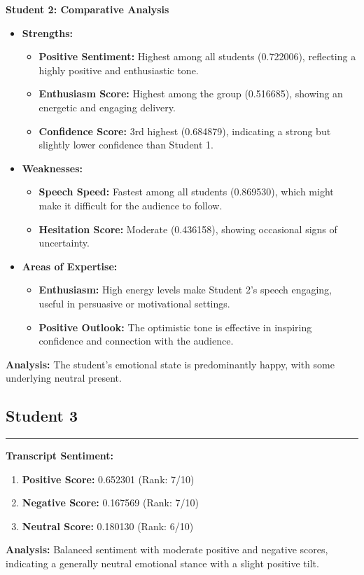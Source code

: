 \documentclass{article}
\begin{document}
\textbf{Student 2: Comparative Analysis}
\begin{itemize}
    \item \textbf{Strengths:}
    \begin{itemize}
        \item \textbf{Positive Sentiment:} Highest among all students (0.722006), reflecting a highly positive and enthusiastic tone.
        \item \textbf{Enthusiasm Score:} Highest among the group (0.516685), showing an energetic and engaging delivery.
        \item \textbf{Confidence Score:} 3rd highest (0.684879), indicating a strong but slightly lower confidence than Student 1.
    \end{itemize}
    \item \textbf{Weaknesses:}
    \begin{itemize}
        \item \textbf{Speech Speed:} Fastest among all students (0.869530), which might make it difficult for the audience to follow.
        \item \textbf{Hesitation Score:} Moderate (0.436158), showing occasional signs of uncertainty.
    \end{itemize}
    \item \textbf{Areas of Expertise:}
    \begin{itemize}
        \item \textbf{Enthusiasm:} High energy levels make Student 2's speech engaging, useful in persuasive or motivational settings.
        \item \textbf{Positive Outlook:} The optimistic tone is effective in inspiring confidence and connection with the audience.
    \end{itemize}
\end{itemize}
    \textbf{Analysis:} The student's emotional state is predominantly happy, with some underlying neutral present.

\subsection{Student 3}
\begin{center}
    \color{green}\rule{1\linewidth}{0.7mm}
\end{center}
\large{\textbf{Transcript Sentiment:}}
\begin{tcolorbox}[title=Sentiment Breakdown]
    \begin{enumerate}
        \item \textbf{Positive Score:} \textcolor{green!70!black}{0.652301} (Rank: 7/10)
        \item \textbf{Negative Score:} \textcolor{red!70!black}{0.167569} (Rank: 7/10)
        \item \textbf{Neutral Score:} \textcolor{blue!70!black}{0.180130} (Rank: 6/10)
    \end{enumerate}
\end{tcolorbox}
    \textbf{Analysis:} Balanced sentiment with moderate positive and negative scores, indicating a generally neutral emotional stance with a slight positive tilt.
\end{document}
